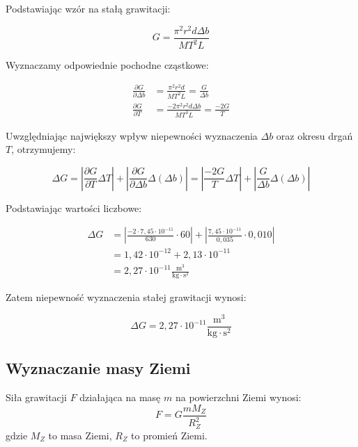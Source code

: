 \documentclass[a4paper,12pt]{article}
\begin{document}
Podstawiając wzór na stałą grawitacji:

\begin{equation*}
    G = \frac{\pi^2 r^2 d \Delta b}{MT^2L}
\end{equation*}

Wyznaczamy odpowiednie pochodne cząstkowe:

\begin{align*}
    \frac{\partial G}{\partial \Delta b} & = \frac{\pi^2 r^2 d}{MT^2L} = \frac{G}{\Delta b}       \\[8pt]
    \frac{\partial G}{\partial T}        & = \frac{-2\pi^2 r^2 d \Delta b}{MT^3L} = \frac{-2G}{T}
\end{align*}

Uwzględniając największy wpływ niepewności wyznaczenia $\Delta b$ oraz okresu drgań $T$, otrzymujemy:

\begin{equation*}
    \Delta G = \left| \frac{\partial G}{\partial T} \Delta T \right| + \left| \frac{\partial G}{\partial \Delta b} \Delta(\Delta b) \right| = \left| \frac{-2G}{T} \Delta T \right| + \left| \frac{G}{\Delta b} \Delta(\Delta b) \right|
\end{equation*}

Podstawiając wartości liczbowe:

\begin{align*}
    \Delta G & = \left| \frac{-2 \cdot 7{,}45 \cdot 10^{-11}}{630} \cdot 60 \right| + \left| \frac{7{,}45 \cdot 10^{-11}}{0{,}035} \cdot 0{,}010 \right| \\[8pt]
             & = 1{,}42 \cdot 10^{-12} + 2{,}13 \cdot 10^{-11}                                                                                           \\[8pt]
             & = 2{,}27 \cdot 10^{-11} \frac{\text{m}^3}{\text{kg} \cdot \text{s}^2}
\end{align*}

Zatem niepewność wyznaczenia stałej grawitacji wynosi:

\begin{equation}
    \Delta G = 2{,}27 \cdot 10^{-11} \frac{\text{m}^3}{\text{kg} \cdot \text{s}^2}
\end{equation}

\subsection{Wyznaczanie masy Ziemi}


Siła grawitacji $F$ działająca na masę $m$ na powierzchni Ziemi wynosi:
\begin{equation}
    \label{eq:f_ziemia}
    F = G \frac{mM_Z}{R_Z^2}
\end{equation}
gdzie $M_Z$ to masa Ziemi, $R_Z$ to promień Ziemi.
\end{document}
